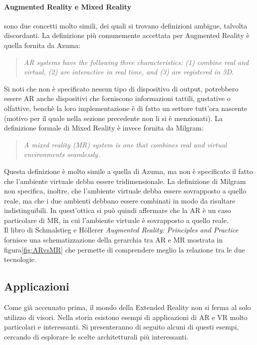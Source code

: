         \paragraph{Augmented Reality e Mixed Reality} sono due concetti molto simili, dei quali si trovano
            definizioni ambigue, talvolta discordanti. La definizione più comunemente accettata per Augmented 
            Reality è quella fornita da Azuma\cite{Azuma1997}:
            \begin{quote}
                \textit{AR systems have the following three characteristics: (1) combine real and virtual, 
                (2) are interactive in real time, and (3) are registered in 3D.}
            \end{quote}
            Si noti che non è specificato nessun tipo di dispositivo di output, potrebbero essere 
            AR anche dispositivi che forniscono informazioni tattili, gustative o olfattive, benchè
            la loro implementazione è di fatto un settore tutt'ora nascente (motivo per il quale nella sezione
            precedente non li si è menzionati). La definizione formale di Mixed Reality è invece 
            fornita da Milgram\cite{Milgram1994}:
            \begin{quote}
                \textit{A mixed reality (MR) system is one that combines real and virtual environments 
                seamlessly.}
            \end{quote}
            Questa definizione è molto simile a quella di Azuma, ma non è specificato il fatto che
            l'ambiente virtuale debba essere tridimensionale. La definizione di Milgram
            non specifica, inoltre, che l'ambiente virtuale debba essere sovrapposto a quello reale, ma che
            i due ambienti debbano essere combinati in modo da risultare indistinguibili. In quest'ottica 
            si può quindi affermare che la AR è un caso particolare di MR, in cui l'ambiente virtuale è
            sovrapposto a quello reale. \\
            Il libro di Schmalstieg e Höllerer \textit{Augmented Reality: Principles and Practice}\cite{Schmalstieg2016} 
            fornisce una schematizzazione della gerarchia tra AR e MR mostrata in figura\ref{fig:ARvsMR}
            che permette di comprendere meglio la relazione tra le due tecnologie. 
            
    \subsection{Applicazioni}\label{subsec:XRTipologie}
        Come già accennato prima, il mondo della Extended Reality non si ferma al solo utilizzo di visori.
        Nella storia esistono esempi di applicazioni di AR e VR molto particolari e interessanti. Si presenteranno
        di seguito alcuni di questi esempi, cercando di esplorare le scelte architetturali più interessanti.
